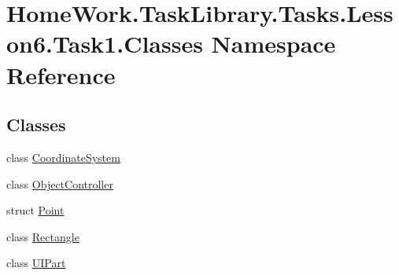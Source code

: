 \hypertarget{namespace_home_work_1_1_task_library_1_1_tasks_1_1_lesson6_1_1_task1_1_1_classes}{}\section{Home\+Work.\+Task\+Library.\+Tasks.\+Lesson6.\+Task1.\+Classes Namespace Reference}
\label{namespace_home_work_1_1_task_library_1_1_tasks_1_1_lesson6_1_1_task1_1_1_classes}
\subsection*{Classes}
\begin{DoxyCompactItemize}
\item 
class \mbox{\hyperlink{class_home_work_1_1_task_library_1_1_tasks_1_1_lesson6_1_1_task1_1_1_classes_1_1_coordinate_system}{Coordinate\+System}}
\item 
class \mbox{\hyperlink{class_home_work_1_1_task_library_1_1_tasks_1_1_lesson6_1_1_task1_1_1_classes_1_1_object_controller}{Object\+Controller}}
\item 
struct \mbox{\hyperlink{struct_home_work_1_1_task_library_1_1_tasks_1_1_lesson6_1_1_task1_1_1_classes_1_1_point}{Point}}
\item 
class \mbox{\hyperlink{class_home_work_1_1_task_library_1_1_tasks_1_1_lesson6_1_1_task1_1_1_classes_1_1_rectangle}{Rectangle}}
\item 
class \mbox{\hyperlink{class_home_work_1_1_task_library_1_1_tasks_1_1_lesson6_1_1_task1_1_1_classes_1_1_u_i_part}{U\+I\+Part}}
\end{DoxyCompactItemize}
